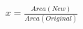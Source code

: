 \documentclass[preview]{standalone}
\begin{document}
\begin{align*}
x = \frac{Area(New)}{Area(Original)}
\end{align*}
\end{document}
